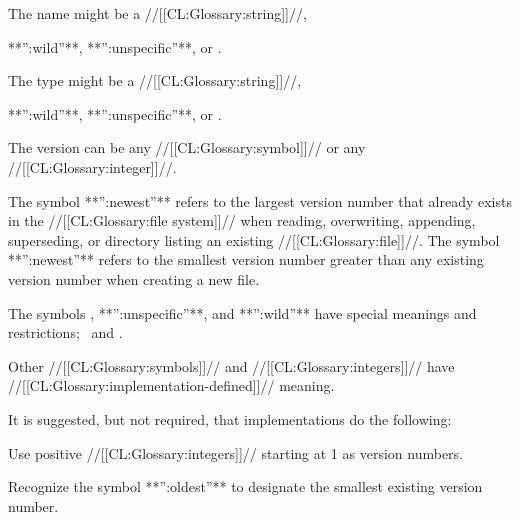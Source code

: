 \endsubsubsubsubsection%

\endsubsubsubsection%


The name might be a //[[CL:Glossary:string]]//,

**'':wild''**, **'':unspecific''**, or \nil.

\endsubsubsubsection%


The type might be a //[[CL:Glossary:string]]//,

**'':wild''**, **'':unspecific''**, or \nil.

\endsubsubsubsection%


The version can be any //[[CL:Glossary:symbol]]// or any //[[CL:Glossary:integer]]//.  

The symbol **'':newest''** refers to the largest version number  that already exists in the //[[CL:Glossary:file system]]// when reading, overwriting, appending, superseding, or directory listing  an existing //[[CL:Glossary:file]]//. The symbol **'':newest''** refers to the smallest version number greater than any existing version number when creating a new file.

The symbols \nil, **'':unspecific''**, and **'':wild''** have special meanings and restrictions; \seesection\SpecialComponentValues\ and \secref\ConstructingPathnames.

Other //[[CL:Glossary:symbols]]// and //[[CL:Glossary:integers]]// have //[[CL:Glossary:implementation-defined]]// meaning.


It is suggested, but not required, that implementations do the following:

\beginlist

\itemitem{\bull} Use positive //[[CL:Glossary:integers]]// starting at 1 as version numbers.

\itemitem{\bull} Recognize the symbol **'':oldest''** 		 to designate the smallest existing version number.

